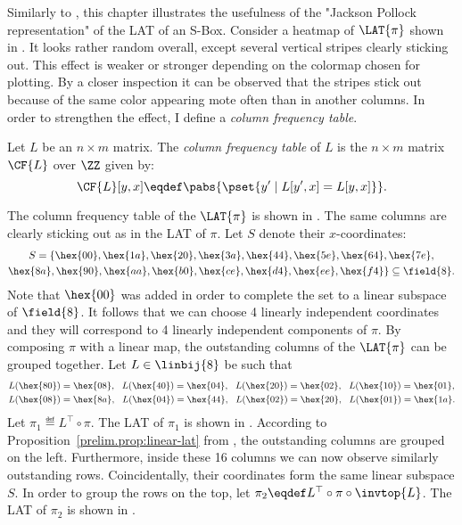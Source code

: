 
Similarly to , this chapter illustrates the usefulness of the "Jackson Pollock representation" of the LAT of an S-Box. Consider a heatmap of $\LAT{\pi}$ shown in . It looks rather random overall, except several vertical stripes clearly sticking out. This effect is weaker or stronger depending on the colormap chosen for plotting. By a closer inspection it can be observed that the stripes stick out because of the same color appearing mote often than in another columns. In order to strengthen the effect, I define a \emph{column frequency table}.
\begin{definition}
Let $L$ be an $n \times m$ matrix. The \emph{column frequency table} of $L$ is the $n\times m$ matrix $\CF{L}$ over $\ZZ$ given by:
$$
\CF{L}[y,x] \eqdef \pabs{\pset{y' \mid L[y',x] = L[y,x]}}.
$$
\end{definition}


The column frequency table of the $\LAT{\pi}$ is shown in . The same columns are clearly sticking out as in the LAT of $\pi$. Let $S$ denote their $x$-coordinates:
\begin{multline*}
S = \{
\hex{00},
\hex{1a},
\hex{20},
\hex{3a},
\hex{44},
\hex{5e},
\hex{64},
\hex{7e},\\
\hex{8a},
\hex{90},
\hex{aa},
\hex{b0},
\hex{ce},
\hex{d4},
\hex{ee},
\hex{f4}
\}\subseteq\field{8}.
\end{multline*}
Note that $\hex{00}$ was added in order to complete the set to a linear subspace of $\field{8}$. It follows that we can choose 4 linearly independent coordinates and they will correspond to 4 linearly independent components of $\pi$. By composing $\pi$ with a linear map, the outstanding columns of the $\LAT{\pi}$ can be grouped together. Let $L\in \linbij{8}$ be such that
\begin{align*}
L(\hex{80}) &= \hex{08},~~
L(\hex{40}) = \hex{04},~~
L(\hex{20}) = \hex{02},~~
L(\hex{10}) = \hex{01},\\
L(\hex{08}) &= \hex{8a},~~
L(\hex{04}) = \hex{44},~~
L(\hex{02}) = \hex{20},~~
L(\hex{01}) = \hex{1a}.
\end{align*}
Let $\pi_1 \eqdef L^{\top} \circ \pi$. The LAT of $\pi_1$ is shown in . According to Proposition~\ref{prelim.prop:linear-lat} from , the outstanding columns are grouped on the left. Furthermore, inside these 16 columns we can now observe similarly outstanding rows. Coincidentally, their coordinates form the same linear subspace $S$. In order to group the rows on the top, let $\pi_2 \eqdef L^{\top} \circ \pi \circ \invtop{L}$. The LAT of $\pi_2$ is shown in .

